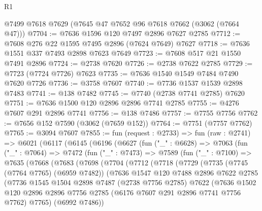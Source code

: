 \begin{lexlean}{R1}
\begin{coremodule}
    @7499
    @7618
    @7629
    (@7645 @47 @7652 @96 @7618 @7662 (@3062 (@7664 @47)))
@7704 := @7636 @1596 @120 @7497 @2896 @7627 @2785
@7712 := @7608 @276 @22 @1595 @7495 @2896 (@7624 @7649) @7627
@7718 := @7636 @1551 @337 @7493 @2898 @7623 @7649
@7723 := @7608 @517 @21 @1550 @7491 @2896
@7724 := @2738 @7620
@7726 := @2738 @7622 @2785
@7729 := @7723 (@7724 @7726) @7623
@7735 := @7636 @1540 @1549 @7484 @7490 @7620 @7726
@7736 := @3758 @7607
@7740 := @7736 @1537 @1539 @2898 @7483
@7741 := @138 @7482
@7745 := @7740 (@2738 @7741 @2785) @7620
@7751 := @7636 @1500 @120 @2896 @2896 @7741 @2785
@7755 := @4276 @7607 @291 @2896 @7741
@7756 := @138 @7486
@7757 := @7755 @7756
@7762 := @7656 @152 @7590 (@3062 (@7659 @152))
@7764 := @7751 (@7757 @7762)
@7765 := @3094 @7607
@7855 := fun (request : @2733) =>
  fun (raw : @2741) =>
  @6021
    (@6117
      (@6145
        (@6196
          (@6627
            (fun ("_" : @6628) =>
            @7063
              (fun ("_" : @7064) =>
              @7472
                (fun ("_" : @7473) =>
                @7589
                  (fun ("_" : @7100) =>
                  @7635
                    (@7668
                      (@7683
                        (@7698
                          (@7704
                            (@7712
                              (@7718
                                (@7729
                                  (@7735
                                    (@7745 (@7764 @7765) (@6959 @7482))
                                    (@7636
                                      @1547
                                      @120
                                      @7488
                                      @2896
                                      @7622
                                      @2785
                                      (@7736
                                        @1545
                                        @1504
                                        @2898
                                        @7487
                                        (@2738 @7756 @2785)
                                        @7622
                                        (@7636
                                          @1502
                                          @120
                                          @2896
                                          @2896
                                          @7756
                                          @2785
                                          (@6176 @7607 @291 @2896 @7741 @7756 @7762)
                                          @7765)
                                        (@6992 @7486))

\end{coremodule}
\end{lexlean}

